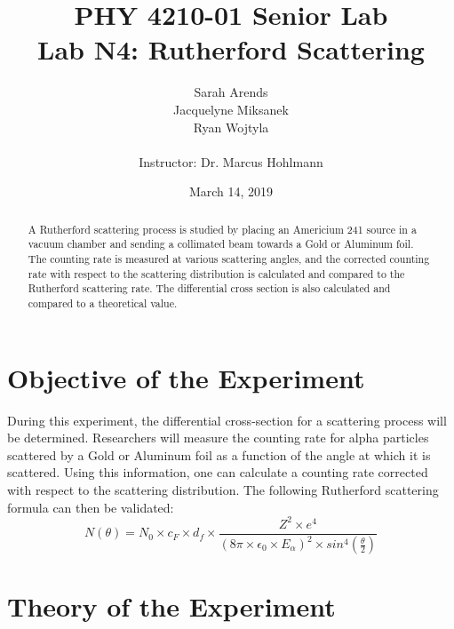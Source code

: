 \documentclass[a4paper]{article}
\title{PHY 4210-01 Senior Lab \\Lab N4: Rutherford Scattering}
\author{Sarah Arends \\
        Jacquelyne Miksanek \\
        Ryan Wojtyla \\ \\
        Instructor: Dr. Marcus Hohlmann}
\date{March 14, 2019}
\begin{document}
\maketitle

\begin{abstract}
\qq A Rutherford scattering process is studied by placing an Americium 241 source in a vacuum chamber and sending a collimated beam towards a Gold or Aluminum foil. The counting rate is measured at various scattering angles, and the corrected counting rate with respect to the scattering distribution is calculated and compared to the Rutherford scattering rate. The differential cross section is also calculated and compared to a theoretical value.
\end{abstract}

\newpage

\tableofcontents

\newpage

\section{Objective of the Experiment}
\qq During this experiment, the differential cross-section for a scattering
process will be determined. Researchers will measure the counting rate for alpha
particles scattered by a Gold or Aluminum foil as a function of the angle at
which it is scattered. Using this information, one can calculate a counting rate
corrected with respect to the scattering distribution. The following Rutherford
scattering formula can then be validated:
\begin{equation}
N(\theta) = N_0 \times c_F \times d_f \times
            \frac {Z^2 \times e^4}
                  {
                  \left( 8\pi \times \epsilon_0\times E_{\alpha} \right) ^2
                   \times  sin^4 \left( \frac{\theta}{2} \right)
                  }
\end{equation}

\section{Theory of the Experiment}
\end{document}
